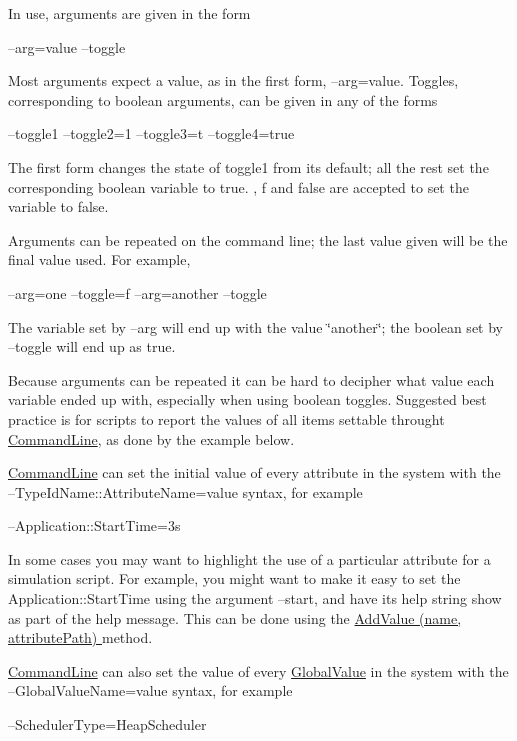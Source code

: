 In use, arguments are given in the form \begin{DoxyVerb}--arg=value --toggle \end{DoxyVerb}
 Most arguments expect a value, as in the first form, {\ttfamily --arg=value}. Toggles, corresponding to boolean arguments, can be given in any of the forms \begin{DoxyVerb}--toggle1 --toggle2=1 --toggle3=t --toggle4=true \end{DoxyVerb}
 The first form changes the state of toggle1 from its default; all the rest set the corresponding boolean variable to true. {}, {\ttfamily f} and {\ttfamily false} are accepted to set the variable to false.

Arguments can be repeated on the command line; the last value given will be the final value used. For example, \begin{DoxyVerb}--arg=one --toggle=f --arg=another --toggle \end{DoxyVerb}
 The variable set by {\ttfamily --arg} will end up with the value {\ttfamily \char`\"{}another\char`\"{}}; the boolean set by {\ttfamily --toggle} will end up as {\ttfamily true}.

Because arguments can be repeated it can be hard to decipher what value each variable ended up with, especially when using boolean toggles. Suggested best practice is for scripts to report the values of all items settable throught \hyperlink{classns3_1_1CommandLine}{Command\+Line}, as done by the example below.

\hyperlink{classns3_1_1CommandLine}{Command\+Line} can set the initial value of every attribute in the system with the {\ttfamily --Type\+Id\+Name\+::\+Attribute\+Name=value} syntax, for example \begin{DoxyVerb}--Application::StartTime=3s \end{DoxyVerb}
 In some cases you may want to highlight the use of a particular attribute for a simulation script. For example, you might want to make it easy to set the {\ttfamily Application\+::\+Start\+Time} using the argument {\ttfamily --start}, and have its help string show as part of the help message. This can be done using the \hyperlink{classns3_1_1CommandLine_ad66977ccb2c042574cb1831b8c1ad18f}{Add\+Value (name, attribute\+Path) } method.

\hyperlink{classns3_1_1CommandLine}{Command\+Line} can also set the value of every \hyperlink{classns3_1_1GlobalValue}{Global\+Value} in the system with the {\ttfamily --Global\+Value\+Name=value} syntax, for example \begin{DoxyVerb}--SchedulerType=HeapScheduler \end{DoxyVerb}


